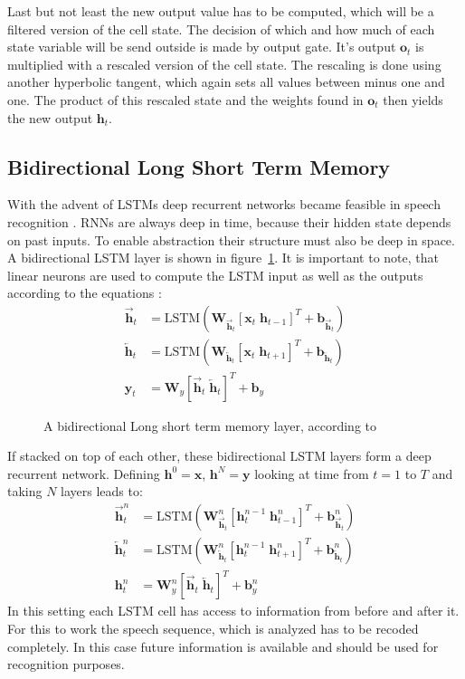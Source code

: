 Last but not least the new output value has to be computed, which will be a filtered version of the cell state. The decision of which and how much of each state variable will be send outside is made by output gate. It's output $\mathbf{o}_t$ is multiplied with a rescaled version of the cell state. The rescaling is done using another hyperbolic tangent, which again sets all values between minus one and one. The product of this rescaled state and the weights found in $\mathbf{o}_t$ then yields the new output $\mathbf{h}_t$. 

\subsection{Bidirectional Long Short Term Memory}
With the advent of LSTMs deep recurrent networks became feasible in speech recognition \cite{Graves2013b}. RNNs are always deep in time, because their hidden state depends on past inputs. To enable abstraction their structure must also be deep in space. A bidirectional LSTM layer is shown in figure~\ref{fig:blstm}. It is important to note, that linear neurons are used to compute the LSTM input as well as the outputs according to the equations \cite{Graves2013b}:
\begin{align}
\overrightarrow{\mathbf{h}}_t &= \text{LSTM}(\mathbf{W}_{\overrightarrow{\mathbf{h}}_t} [\mathbf{x}_t \; \mathbf{h}_{t-1}]^T + \mathbf{b}_{\overrightarrow{\mathbf{h}}_t}) 
\\
\overleftarrow{\mathbf{h}}_t &= \text{LSTM}(\mathbf{W}_{\overleftarrow{\mathbf{h}}_t} [\mathbf{x}_t \; \mathbf{h}_{t+1}]^T + \mathbf{b}_{\overleftarrow{\mathbf{h}}_t})
\\
\mathbf{y}_t &= \mathbf{W}_{y} [\overrightarrow{\mathbf{h}}_t \; \overleftarrow{\mathbf{h}}_t]^T + \mathbf{b}_y  
\end{align}
\begin{figure}
\centering

\caption{A bidirectional Long short term memory layer, according to \cite{Graves2013b} }
\label{fig:blstm}
\end{figure}
If stacked on top of each other, these bidirectional LSTM layers form a deep recurrent network. Defining $\mathbf{h}^0 = \mathbf{x}$, $\mathbf{h}^N = \mathbf{y}$ looking at time from $t = 1$ to $T$ and taking $N$ layers leads to:
\begin{align}
\overrightarrow{\mathbf{h}}_t^n &= \text{LSTM}(\mathbf{W}_{\overrightarrow{\mathbf{h}}_t}^n [\mathbf{h}_t^{n-1} \; \mathbf{h}_{t-1}^n]^T + \mathbf{b}_{\overrightarrow{\mathbf{h}}_t}^n) 
\\
\overleftarrow{\mathbf{h}}_t^n &= \text{LSTM}(\mathbf{W}_{\overleftarrow{\mathbf{h}}_t}^n [\mathbf{h}_t^{n-1} \; \mathbf{h}_{t+1}^n]^T + \mathbf{b}_{\overleftarrow{\mathbf{h}}_t}^n)
\\
\mathbf{h}_t^n &= \mathbf{W}_{y}^n [\overrightarrow{\mathbf{h}}_t \; \overleftarrow{\mathbf{h}}_t]^T + \mathbf{b}_y^n
\end{align}
In this setting each LSTM cell has access to information from before and after it. For this to work the speech sequence, which is analyzed has to be recoded completely. In this case future information is available and should be used for recognition purposes.

